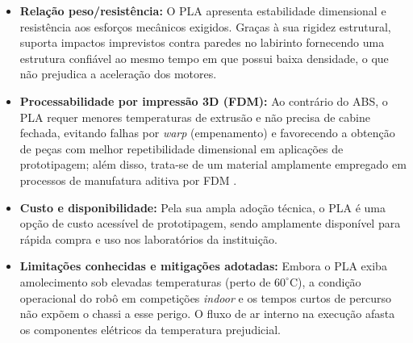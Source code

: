 \begin{itemize}
    \item \textbf{Relação peso/resistência:}
          O PLA apresenta estabilidade dimensional e resistência aos esforços mecânicos exigidos. Graças à sua rigidez estrutural, suporta impactos imprevistos contra paredes no labirinto fornecendo uma estrutura confiável ao mesmo tempo em que possui baixa densidade, o que não prejudica a aceleração dos motores.

    \item \textbf{Processabilidade por impressão 3D (FDM):}
          Ao contrário do ABS, o PLA requer menores temperaturas de extrusão e não precisa de cabine fechada, evitando falhas por \textit{warp} (empenamento) e favorecendo a obtenção de peças com melhor repetibilidade dimensional em aplicações de prototipagem; além disso, trata-se de um material amplamente empregado em processos de manufatura aditiva por FDM \cite{sandanamsamy2022fdm_pla}.

    \item \textbf{Custo e disponibilidade:}
          Pela sua ampla adoção técnica, o PLA é uma opção de custo acessível de prototipagem, sendo amplamente disponível para rápida compra e uso nos laboratórios da instituição.

    \item \textbf{Limitações conhecidas e mitigações adotadas:}
          Embora o PLA exiba amolecimento sob elevadas temperaturas (perto de $60^{\circ}\text{C}$), a condição operacional do robô em competições \textit{indoor} e os tempos curtos de percurso não expõem o chassi a esse perigo. O fluxo de ar interno na execução afasta os componentes elétricos da temperatura prejudicial.
\end{itemize}




